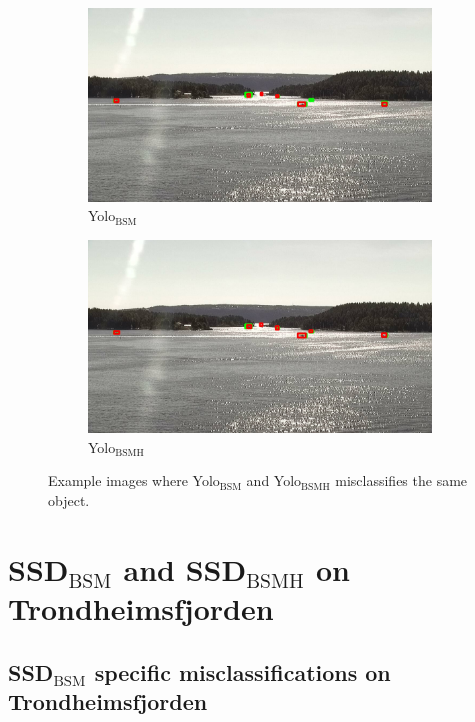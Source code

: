 \begin{figure}[h!]
\begin{subfigure}{.5\textwidth}
  \centering
  \includegraphics[width=0.9\linewidth]{results/case_buildings/yolo23/samemistake/yolo2/selected_08_11_frame3200.jpg}
  \caption{Yolo$_{\text{BSM}}$}
\end{subfigure}%
\begin{subfigure}{.5\textwidth}
  \centering
  \includegraphics[width=.9\linewidth]{results/case_buildings/yolo23/samemistake/yolo3/selected_08_11_frame3200.jpg}
  \caption{Yolo$_{\text{BSMH}}$}
\end{subfigure}
\caption{Example images where Yolo$_{\text{BSM}}$ and Yolo$_{\text{BSMH}}$ misclassifies the same object.}
\label{img:yolo2_better}

\end{figure}

\newpage

\section{SSD$_{\text{BSM}}$ and SSD$_{\text{BSMH}}$ on Trondheimsfjorden}

\subsection{SSD$_{\text{BSM}}$ specific misclassifications on Trondheimsfjorden}
\label{sec:trf_ssd_bigbox}

